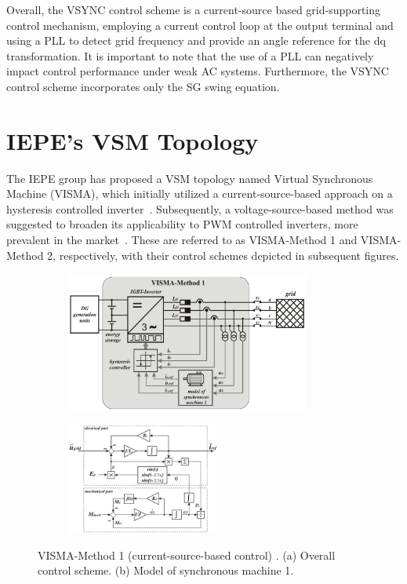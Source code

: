 Overall, the VSYNC control scheme is a current-source based grid-supporting control
mechanism, employing a current control loop at the output terminal and using a
PLL to detect grid frequency and provide an angle reference for the dq
transformation. It is important to note that the use of a PLL can negatively
impact control performance under weak AC systems. Furthermore, the VSYNC control
scheme incorporates only the SG swing equation.

\section{IEPE's VSM Topology}\label{sec:VISMA}

The IEPE group has proposed a VSM topology named Virtual Synchronous Machine
(VISMA), which initially utilized a current-source-based approach on a
hysteresis controlled inverter~\cite{beck2007vsm,chen2011improving}.
Subsequently, a voltage-source-based method was suggested to broaden its
applicability to PWM controlled inverters, more prevalent in the
market~\cite{chen2012comparison}. These are referred to as VISMA-Method 1 and
VISMA-Method 2, respectively, with their control schemes depicted in subsequent
figures.


\newpage
\begin{figure}[ht!]
    \centering
    \begin{subfigure}[b]{\textwidth}
        \centering
        \includegraphics[width=8cm]{images/VISMA1Concept.png}
        \caption{}
        \label{fig:VISMA1Concept}
    \end{subfigure}

    \begin{subfigure}[b]{\textwidth}
        \centering
        \includegraphics[width=5cm]{images/VISMA1block.png}
        \caption{}
        \label{fig:VISMA1block}
    \end{subfigure}
    \label{fig:VISMA1}
    \caption{VISMA-Method 1 (current-source-based control) \cite{chen2012comparison}. (a) Overall control scheme. (b) Model of synchronous machine 1.}
\end{figure}

